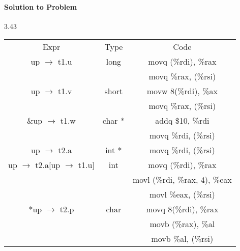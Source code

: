 \documentclass{report}
\begin{document}
\paragraph{Solution to Problem } 3.43\\ 
\begin{center}
\begin{tabular}{ |c|c|c| } 
\hline
Expr & Type & Code \\
up $\rightarrow$ t1.u & long & movq (\%rdi), \%rax \\
& & movq \%rax, (\%rsi) \\ \hline
up $\rightarrow$ t1.v & short & movw 8(\%rdi), \%ax \\
& & movq \%rax, (\%rsi) \\ \hline 
\&up $\rightarrow$ t1.w & char * & addq \$10, \%rdi \\
& & movq \%rdi, (\%rsi) \\ \hline
up $\rightarrow$ t2.a & int * & movq \%rdi, (\%rsi) \\ \hline
up $\rightarrow$ t2.a[up $\rightarrow$ t1.u] & int & movq (\%rdi), \%rax \\
& & movl (\%rdi, \%rax, 4), \%eax \\
& & movl \%eax, (\%rsi) \\ \hline
*up $\rightarrow$ t2.p & char & movq 8(\%rdi), \%rax \\
& & movb (\%rax), \%al \\
& & movb \%al, (\%rsi) \\ \hline
\end{tabular}
\end{center}
\end{document}
